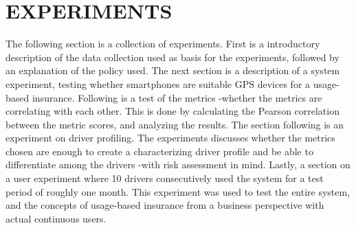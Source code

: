 \section{EXPERIMENTS}\label{sec:experiments}

The following section is a collection of experiments. First is a introductory description of the data collection used as basis for the experiments, followed by an explanation of the policy used. The next section is a description of a system experiment, testing whether smartphones are suitable GPS devices for a usage-based insurance. Following is a test of the metrics -whether the metrics are correlating with each other. This is done by calculating the Pearson correlation between the metric scores, and analyzing the results. The section following is an experiment on driver profiling. The experiments discusses whether the metrics chosen are enough to create a characterizing driver profile and be able to differentiate among the drivers -with risk assessment in mind. Lastly, a section on a user experiment where 10 drivers consecutively used the system for a test period of roughly one month. This experiment was used to test the entire system, and the concepts of usage-based insurance from a business perspective with actual continuous users.




